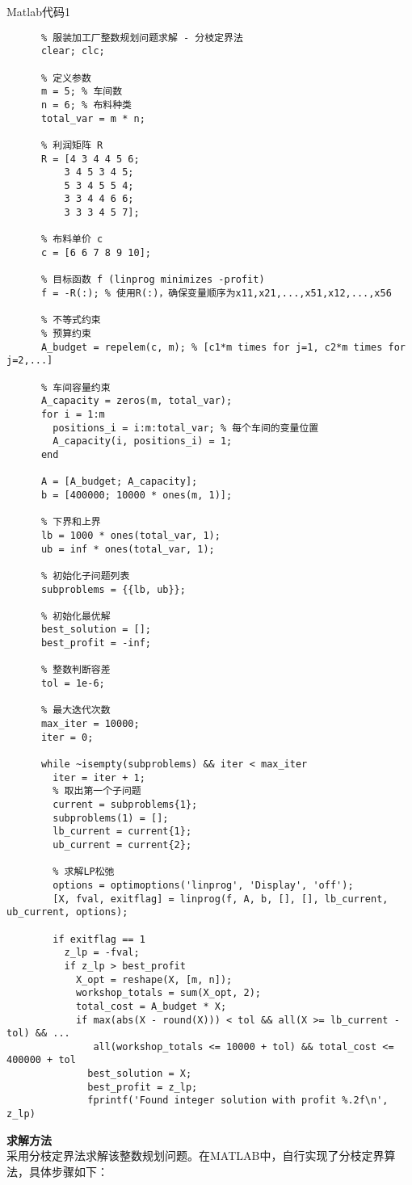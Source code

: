 \begin{codebox}{Matlab代码}{1}
    \begin{verbatim}
      % 服装加工厂整数规划问题求解 - 分枝定界法
      clear; clc;
      
      % 定义参数
      m = 5; % 车间数
      n = 6; % 布料种类
      total_var = m * n;
      
      % 利润矩阵 R
      R = [4 3 4 4 5 6;
          3 4 5 3 4 5;
          5 3 4 5 5 4;
          3 3 4 4 6 6;
          3 3 3 4 5 7];
      
      % 布料单价 c
      c = [6 6 7 8 9 10];
      
      % 目标函数 f (linprog minimizes -profit)
      f = -R(:); % 使用R(:)，确保变量顺序为x11,x21,...,x51,x12,...,x56
      
      % 不等式约束
      % 预算约束
      A_budget = repelem(c, m); % [c1*m times for j=1, c2*m times for j=2,...]
      
      % 车间容量约束
      A_capacity = zeros(m, total_var);
      for i = 1:m
        positions_i = i:m:total_var; % 每个车间的变量位置
        A_capacity(i, positions_i) = 1;
      end
      
      A = [A_budget; A_capacity];
      b = [400000; 10000 * ones(m, 1)];
      
      % 下界和上界
      lb = 1000 * ones(total_var, 1);
      ub = inf * ones(total_var, 1);
      
      % 初始化子问题列表
      subproblems = {{lb, ub}};
      
      % 初始化最优解
      best_solution = [];
      best_profit = -inf;
      
      % 整数判断容差
      tol = 1e-6;
      
      % 最大迭代次数
      max_iter = 10000;
      iter = 0;
      
      while ~isempty(subproblems) && iter < max_iter
        iter = iter + 1;
        % 取出第一个子问题
        current = subproblems{1};
        subproblems(1) = [];
        lb_current = current{1};
        ub_current = current{2};
        
        % 求解LP松弛
        options = optimoptions('linprog', 'Display', 'off');
        [X, fval, exitflag] = linprog(f, A, b, [], [], lb_current, ub_current, options);
        
        if exitflag == 1
          z_lp = -fval;
          if z_lp > best_profit
            X_opt = reshape(X, [m, n]);
            workshop_totals = sum(X_opt, 2);
            total_cost = A_budget * X;
            if max(abs(X - round(X))) < tol && all(X >= lb_current - tol) && ...
               all(workshop_totals <= 10000 + tol) && total_cost <= 400000 + tol
              best_solution = X;
              best_profit = z_lp;
              fprintf('Found integer solution with profit %.2f\n', z_lp)
    \end{verbatim}
\end{codebox}
\textbf{求解方法}\\
采用分枝定界法求解该整数规划问题。在MATLAB中，自行实现了分枝定界算法，具体步骤如下：

